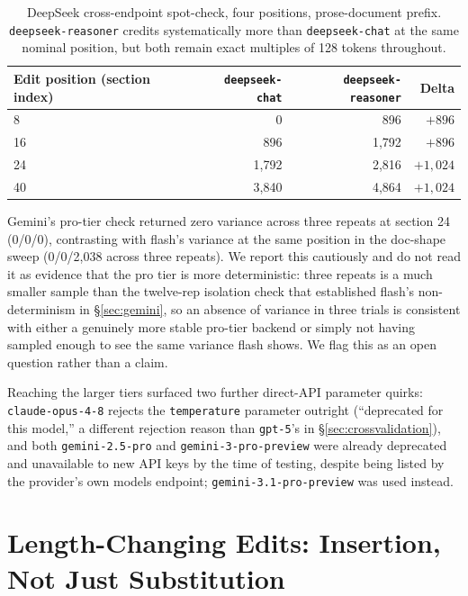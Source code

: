 \documentclass[11pt]{article}
\newcommand{\code}[1]{\texttt{#1}}
\begin{document}
\begin{table}[t]
\centering
\caption{DeepSeek cross-endpoint spot-check, four positions, prose-document
prefix. \code{deepseek-reasoner} credits systematically more than
\code{deepseek-chat} at the same nominal position, but both remain exact
multiples of 128 tokens throughout.}
\label{tab:deepseek-multipos}
\begin{tabular}{@{}lrrr@{}}
\toprule
Edit position (section index) & \code{deepseek-chat} & \code{deepseek-reasoner} & Delta \\
\midrule
8  & 0     & 896   & $+896$ \\
16 & 896   & 1{,}792 & $+896$ \\
24 & 1{,}792 & 2{,}816 & $+1{,}024$ \\
40 & 3{,}840 & 4{,}864 & $+1{,}024$ \\
\bottomrule
\end{tabular}
\end{table}

Gemini's pro-tier check returned zero variance across three repeats at
section 24 (0/0/0), contrasting with flash's variance at the same position
in the doc-shape sweep (0/0/2{,}038 across three repeats). We report this
cautiously and do not read it as evidence that the pro tier is more
deterministic: three repeats is a much smaller sample than the twelve-rep
isolation check that established flash's non-determinism in
\S\ref{sec:gemini}, so an absence of variance in three trials is
consistent with either a genuinely more stable pro-tier backend or simply
not having sampled enough to see the same variance flash shows. We flag
this as an open question rather than a claim.

Reaching the larger tiers surfaced two further direct-API parameter
quirks: \code{claude-opus-4-8} rejects the \code{temperature} parameter
outright (``deprecated for this model,'' a different rejection reason than
\code{gpt-5}'s in \S\ref{sec:crossvalidation}), and both
\code{gemini-2.5-pro} and \code{gemini-3-pro-preview} were already
deprecated and unavailable to new API keys by the time of testing, despite
being listed by the provider's own models endpoint; \code{gemini-3.1-pro-preview}
was used instead.

\section{Length-Changing Edits: Insertion, Not Just Substitution}
\label{sec:insertion}
\end{document}
